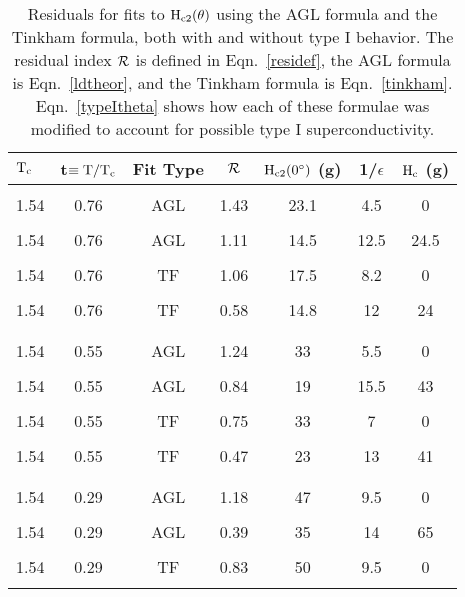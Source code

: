 \begin{table}
\caption[Residuals for fits to $\rm H_{c2}(\theta)$ using the AGL formula
and the Tinkham  formula, both  with and  without type I behavior.]{Residuals
for  fits to  $\rm  H_{c2}(\theta)$  using the AGL   formula  and the Tinkham
formula, both with and without type  I  behavior.  The residual index $\cal
R$ is defined in Eqn.~\ref{residef}, the AGL formula is Eqn.~\ref{ldtheor},
and the  Tinkham formula is  Eqn.~\ref{tinkham}.  Eqn.~\ref{typeItheta} shows
how  each of these  formulae was modified to   account for  possible type I
superconductivity.}
\label{residsum}
\begin{center}
\begin{tabular}{|l|cccccc|}
\hline
$\rm T_c$ & t$\rm \equiv T/T_c$ & Fit Type & $\cal R$ & $\rm H_{c2}(0^{\circ})$ (g)& 1/$\epsilon$ & $\rm H_c$ (g) \\
\hline
& & & & & & \\
1.54 &  0.76 & AGL &1.43 & 23.1 & 4.5 & 0 \\ 
& & & & & & \\
1.54 &  0.76 & AGL &1.11 & 14.5   & 12.5& 24.5 \\
& & & & & & \\
1.54 &  0.76 &  TF & 1.06 & 17.5   & 8.2 & 0 \\
& & & & & & \\
1.54 &  0.76 &  TF & 0.58 & 14.8   & 12& 24 \\
& & & & & & \\
\hline
& & & & & & \\
1.54 & 0.55 &AGL & 1.24 & 33 & 5.5 & 0 \\
& & & & & & \\
1.54 & 0.55 &AGL & 0.84 & 19 & 15.5  & 43 \\
& & & & & & \\
1.54 & 0.55 &TF  & 0.75 & 33 &  7  &  0 \\
& & & & & & \\
1.54 & 0.55 &TF  & 0.47 & 23 & 13  & 41 \\
& & & & & & \\
\hline
& & & & & & \\
1.54 & 0.29 &AGL & 1.18 & 47 & 9.5  & 0 \\
& & & & & & \\
1.54 & 0.29 &AGL & 0.39 & 35 & 14  & 65 \\
& & & & & & \\
1.54 & 0.29 &TF  & 0.83 & 50 & 9.5  & 0 \\
& & & & & & \\

\end{tabular}
\end{center}
\end{table}
